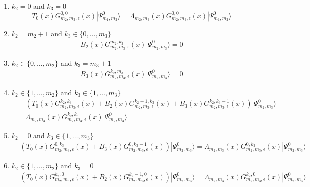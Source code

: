 \documentclass[11pt]{article}
\numberwithin{equation}{section}
\numberwithin{equation}{subsection}
\begin{document}
\begin{enumerate}
\item $k_{2}=0$ and $k_{3}=0$
\begin{equation}\label{cond1}
T_{0}(x)G_{m_{2},m_{3},\epsilon}^{0,0}(x)|\Psi_{m_{1},m_{2}}^{0}\rangle=\Lambda_{m_{2},m_{3}}(x)G_{m_{2},m_{3},\epsilon}^{0,0}(x)|\Psi_{m_{1},m_{2}}^{0}\rangle
\end{equation}
\item $k_{2}=m_{2}+1$ and $k_{3}\in \{0,\ldots,m_{3}\}$
\begin{equation}\label{cond2}
\begin{split}
B_{2}(x)G_{m_{2},m_{3},\epsilon}^{m_{2},k_{3}}(x)|\Psi_{m_{2},m_{3}}^{0}\rangle=0
\end{split}
\end{equation}
\item $k_{2}\in\{0,\ldots,m_{2}\}$ and $k_{3}=m_{3}+1$
\begin{equation}\label{cond3}
\begin{split}
B_{3}(x)G_{m_{2},m_{3},\epsilon}^{k_{2},m_{3}}(x)|\Psi_{m_{2},m_{3}}^{0}\rangle=0
\end{split}
\end{equation}
\item $k_{2}\in \{1,\ldots,m_{2}\}$ and $k_{3}\in\{1,\ldots,m_{3}\}$
\begin{equation}\label{cond4}
\begin{split}
&\left(T_{0}(x)G_{m_{2},m_{3},\epsilon}^{k_{2},k_{3}}(x)+B_{2}(x)G_{m_{2},m_{3},\epsilon}^{k_{2}-1,k_{3}}(x)+B_{3}(x)G_{m_{2},m_{3},\epsilon}^{k_{2},k_{3}-1}(x)\right)|\Psi_{m_{2},m_{3}}^{0}\rangle
\\=&
\Lambda_{m_{2},m_{3}}(x)G_{m_{2},m_{3},\epsilon}^{k_{2},k_{3}}(x)|\Psi_{m_{2},m_{3}}^{0}\rangle
\end{split}
\end{equation} 
\item $k_{2}=0$ and $k_{3}\in\{1,\ldots,m_{3}\}$
\begin{equation}\label{cond5}
\begin{split}
&\left(T_{0}(x)G_{m_{2},m_{3},\epsilon}^{0,k_{3}}(x)+B_{3}(x)G_{m_{2},m_{3},\epsilon}^{0,k_{3}-1}(x)\right)|\Psi_{m_{2},m_{3}}^{0}\rangle
=
\Lambda_{m_{2},m_{3}}(x)G_{m_{2},m_{3},\epsilon}^{0,k_{3}}(x)|\Psi_{m_{2},m_{3}}^{0}\rangle
\end{split}
\end{equation}
\item $k_{2}\in\{1,\ldots,m_{2}\}$ and $k_{3}=0$
\begin{equation}\label{cond6}
\begin{split}
&\left(T_{0}(x)G_{m_{2},m_{3},\epsilon}^{k_{2},0}(x)+B_{2}(x)G_{m_{2},m_{3},\epsilon}^{k_{2}-1,0}(x)\right)|\Psi_{m_{2},m_{3}}^{0}\rangle
=
\Lambda_{m_{2},m_{3}}(x)G_{m_{2},m_{3},\epsilon}^{k_{2},0}(x)|\Psi_{m_{2},m_{3}}^{0}\rangle
\end{split}
\end{equation}
\end{enumerate}
\end{document}
